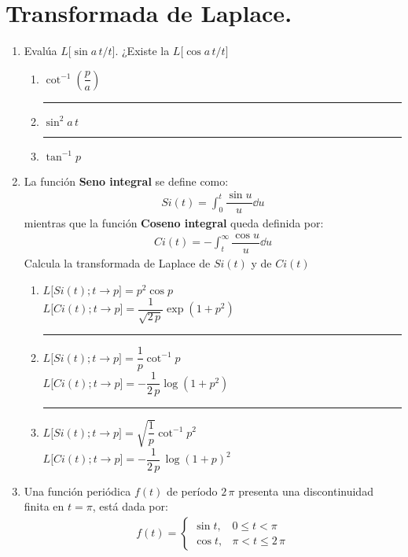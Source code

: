 \section{Transformada de Laplace.}
\begin{enumerate}
\item Evalúa $L \big[\sin a \, t/ t \big]$. ¿Existe la $L \big[\cos a \, t/ t \big]$
\begin{enumerate}[label=1.\alph*)]
\setlength\itemsep{2em}
\item $\cot^{-1} \left( \dfrac{p}{a}\right)$ \hrule
\item $\sin^{2} a \, t$ \hrule
\item $\tan^{-1} p$
\end{enumerate}    
\item La función \textbf{Seno integral} se define como:
\begin{align*}
Si(t) = \int_{0}^{t} \dfrac{\sin u }{u} \dd{u}
\end{align*}
mientras que la función \textbf{Coseno integral} queda definida por:
\begin{align*}
Ci(t) = - \int_{t}^{\infty} \dfrac{\cos u }{u} \dd{u}
\end{align*}
Calcula la transformada de Laplace de $Si(t)$ y de $Ci(t)$
\begin{enumerate}[label=2.\alph*)]
\setlength\itemsep{1.5em}
\item $L \big[Si(t);t \to p\big] = p^{2} \cos p$
\mbox{}\\$L \big[Ci(t);t \to p\big] = \dfrac{1}{\sqrt{2 \, p}} \exp(1 + p^{2})$ \hrule
\item $L \big[Si(t);t \to p\big] = \dfrac{1}{p} \cot^{-1} p$
\mbox{}\\$L \big[Ci(t);t \to p\big] = -\dfrac{1}{2 \, p} \log(1 + p^{2})$ \hrule
\item $L \big[Si(t);t \to p\big] = \sqrt{\dfrac{1}{p}} \cot^{-1} p^{2}$
\mbox{}\\$L \big[Ci(t);t \to p\big] = -\dfrac{1}{2 \, p} \, \log(1 + p)^{2}$
\end{enumerate}
\item Una función periódica $f(t)$ de período $2 \, \pi$ presenta una discontinuidad finita en $t = \pi$, está dada por:
\begin{align*}
f(t) = \begin{cases}
\sin t, & 0 \leq t < \pi \\
\cos t, & \pi < t \leq 2 \, \pi

\end{cases}
\end{align*}
\end{enumerate}
